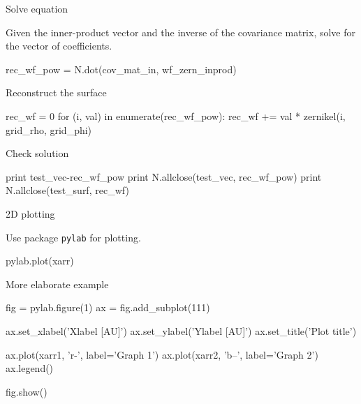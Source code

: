 \documentclass[xetex,10pt]{beamer}
\def\spacer{\vspace*{1em}}
\def\pythoni{\lstinline[language=pythontim]}
\begin{document}
\begin{frame}[fragile]{Solve equation}

Given the inner-product vector and the inverse of the covariance matrix, solve for the vector of coefficients.

\begin{python}
rec_wf_pow = N.dot(cov_mat_in, wf_zern_inprod)
\end{python}

\spacer
Reconstruct the surface
\begin{python}
rec_wf = 0
for (i, val) in enumerate(rec_wf_pow):
  rec_wf += val * zernikel(i, grid_rho, grid_phi)
\end{python}

\spacer
Check solution
\begin{python}
print test_vec-rec_wf_pow
print N.allclose(test_vec, rec_wf_pow)
print N.allclose(test_surf, rec_wf)
\end{python}

\end{frame}

\begin{frame}[fragile]{2D plotting}

Use package \pythoni{pylab} for plotting.

\begin{python}
pylab.plot(xarr)
\end{python}

\spacer
More elaborate example

\begin{python}
fig = pylab.figure(1)
ax = fig.add_subplot(111)

ax.set_xlabel('Xlabel [AU]')
ax.set_ylabel('Ylabel [AU]')
ax.set_title('Plot title')

ax.plot(xarr1, 'r-', label='Graph 1')
ax.plot(xarr2, 'b--', label='Graph 2')
ax.legend()

fig.show()
\end{python}

\end{frame}
\end{document}
